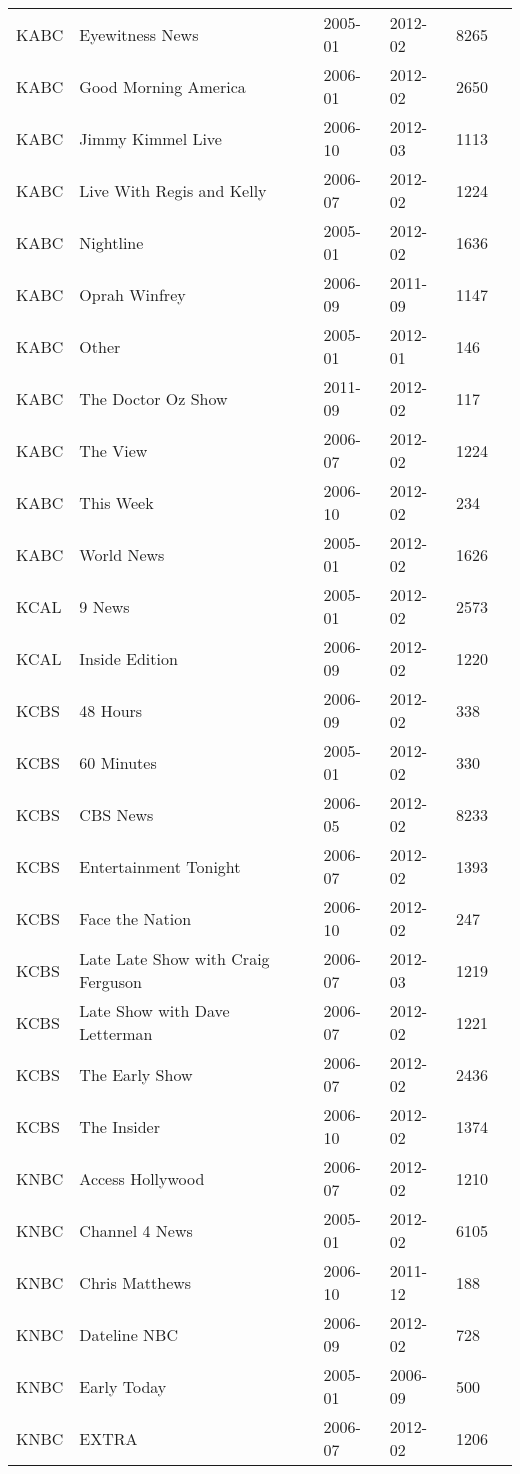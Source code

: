\begin{longtable}{llllll}
  KABC & Eyewitness News & 2005-01 & 2012-02 & 8265 \\ 
  KABC & Good Morning America & 2006-01 & 2012-02 & 2650 \\ 
  KABC & Jimmy Kimmel Live & 2006-10 & 2012-03 & 1113 \\ 
  KABC & Live With Regis and Kelly & 2006-07 & 2012-02 & 1224 \\ 
  KABC & Nightline & 2005-01 & 2012-02 & 1636 \\ 
  KABC & Oprah Winfrey & 2006-09 & 2011-09 & 1147 \\ 
  KABC & Other & 2005-01 & 2012-01 & 146 \\ 
  KABC & The Doctor Oz Show & 2011-09 & 2012-02 & 117 \\ 
  KABC & The View & 2006-07 & 2012-02 & 1224 \\ 
  KABC & This Week & 2006-10 & 2012-02 & 234 \\ 
  KABC & World News & 2005-01 & 2012-02 & 1626 \\ 
  KCAL & 9 News  & 2005-01 & 2012-02 & 2573 \\ 
  KCAL & Inside Edition & 2006-09 & 2012-02 & 1220 \\ 
  KCBS & 48 Hours & 2006-09 & 2012-02 & 338 \\ 
  KCBS & 60 Minutes & 2005-01 & 2012-02 & 330 \\ 
  KCBS & CBS News & 2006-05 & 2012-02 & 8233 \\ 
  KCBS & Entertainment Tonight & 2006-07 & 2012-02 & 1393 \\ 
  KCBS & Face the Nation & 2006-10 & 2012-02 & 247 \\ 
  KCBS & Late Late Show with Craig Ferguson & 2006-07 & 2012-03 & 1219 \\ 
  KCBS & Late Show with Dave Letterman & 2006-07 & 2012-02 & 1221 \\ 
  KCBS & The Early Show & 2006-07 & 2012-02 & 2436 \\ 
  KCBS & The Insider & 2006-10 & 2012-02 & 1374 \\ 
  KNBC & Access Hollywood & 2006-07 & 2012-02 & 1210 \\ 
  KNBC & Channel 4 News & 2005-01 & 2012-02 & 6105 \\ 
  KNBC & Chris Matthews & 2006-10 & 2011-12 & 188 \\ 
  KNBC & Dateline NBC & 2006-09 & 2012-02 & 728 \\ 
  KNBC & Early Today & 2005-01 & 2006-09 & 500 \\ 
  KNBC & EXTRA & 2006-07 & 2012-02 & 1206 \\ 

\end{longtable}
